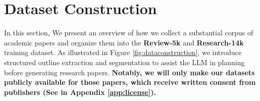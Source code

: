 \documentclass{article} %
\newcommand{\wjdd}[1]{\todo[linecolor=cyan,backgroundcolor=cyan!25,bordercolor=cyan,size=\scriptsize]{(Jindong) #1}}
\begin{document}



\section{Dataset Construction}%
\label{sec:dataset}

In this section, We present an overview of how we collect a substantial corpus of academic papers and organize them into the \textbf{Review-5k} and \textbf{Research-14k} training dataset. As illustrated in Figure \ref{fig:dataconstruction}, we introduce structured outline extraction and segmentation to assist the LLM in planning before generating research papers. \textbf{Notably, we will only make our datasets publicly available for those papers, which receive written consent from publishers (See in Appendix \ref{app:license}).}

\end{document}

